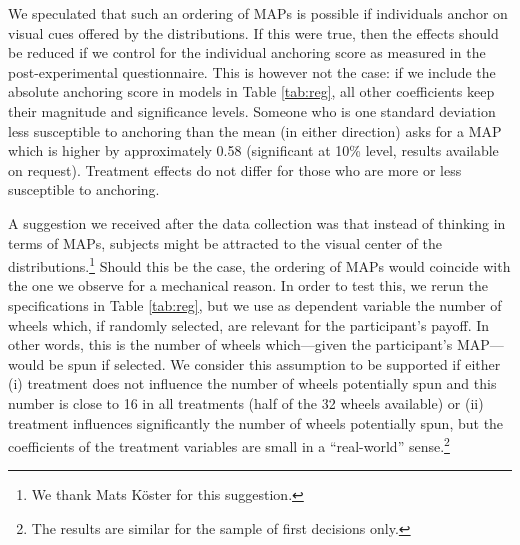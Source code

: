 We speculated that such an ordering of MAPs is possible if individuals anchor on visual cues offered by the distributions.
If this were true, then the effects should be reduced if we control for the individual anchoring score \citep{Cheek2017} as measured in the post-experimental questionnaire.
This is however not the case: if we include the absolute anchoring score in models in Table \ref{tab:reg}, all other coefficients keep their magnitude and significance levels.
Someone who is one standard deviation less susceptible to anchoring than the mean (in either direction) asks for a MAP which is higher by approximately 0.58 (significant at 10\% level, results available on request).
Treatment effects do not differ for those who are more or less susceptible to anchoring.

A suggestion we received after the data collection was that instead of thinking in terms of MAPs, subjects might be attracted to the visual center of the distributions.\footnote{
We thank Mats K\"{o}ster for this suggestion.
}
Should this be the case, the ordering of MAPs would coincide with the one we observe for a mechanical reason.
In order to test this, we rerun the specifications in Table \ref{tab:reg}, but we use as dependent variable the number of wheels which, if randomly selected, are relevant for the participant's payoff.
In other words, this is the number of wheels which---given the participant's MAP---would be spun if selected.
We consider this assumption to be supported if either (i) treatment does not influence the number of wheels potentially spun and this number is close to 16 in all treatments (half of the 32 wheels available) or (ii) treatment  influences significantly the number of wheels potentially spun, but the coefficients of the treatment variables are small in a ``real-world'' sense.\footnote{
The results are similar for the sample of first decisions only.
}

